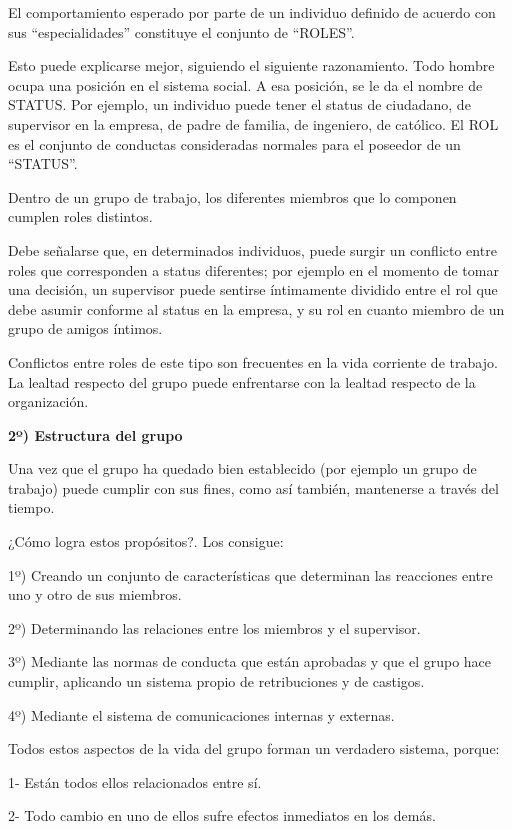 El comportamiento esperado por parte de un individuo definido de acuerdo con sus “especialidades” constituye el conjunto de “ROLES”.

Esto puede explicarse mejor, siguiendo el siguiente razonamiento. Todo hombre ocupa una posición en el sistema social. A esa posición, se le da el nombre de STATUS. Por ejemplo, un individuo puede tener el status de ciudadano, de supervisor en la empresa, de padre de familia, de ingeniero, de católico. El ROL es el conjunto de conductas consideradas normales para el poseedor de un “STATUS”.

Dentro de un grupo de trabajo, los diferentes miembros que lo componen cumplen roles distintos.



Debe señalarse que, en determinados individuos, puede surgir un conflicto entre roles que corresponden a status diferentes; por ejemplo en el momento de tomar una decisión, un supervisor puede sentirse íntimamente dividido entre el rol que debe asumir conforme al status en la empresa, y su rol en cuanto miembro de un grupo de amigos íntimos.

Conflictos entre roles de este tipo son frecuentes en la vida corriente de trabajo. La lealtad respecto del grupo puede enfrentarse con la lealtad respecto de la organización.

\textbf{2º) Estructura del grupo}

Una vez que el grupo ha quedado bien establecido (por ejemplo un grupo de trabajo) puede cumplir con sus fines, como así también, mantenerse a través del tiempo.

¿Cómo logra estos propósitos?. Los consigue:

1º) Creando un conjunto de características que determinan las reacciones entre uno y otro de sus miembros.

2º) Determinando las relaciones entre los miembros y el supervisor.

3º) Mediante las normas de conducta que están aprobadas y que el grupo hace cumplir, aplicando un sistema propio de retribuciones y de castigos.

4º) Mediante el sistema de comunicaciones internas y externas.

Todos estos aspectos de la vida del grupo forman un verdadero sistema, porque:

1- Están todos ellos relacionados entre sí.

2- Todo cambio en uno de ellos sufre efectos inmediatos en los demás.

